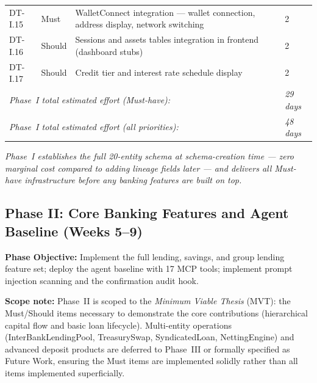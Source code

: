 \documentclass[12pt,a4paper]{report}
\begin{document}
\begin{table}[H]
\begin{tabular}{p{1.8cm}p{1.8cm}p{7.5cm}p{1.5cm}}
DT-I.15 & Must & WalletConnect integration --- wallet connection, address display, network switching & 2 \\
DT-I.16 & Should & Sessions and assets tables integration in frontend (dashboard stubs) & 2 \\
DT-I.17 & Should & Credit tier and interest rate schedule display & 2 \\
\hline
\multicolumn{3}{l}{\textit{Phase~I total estimated effort (Must-have):}} & \textit{29 days} \\
\multicolumn{3}{l}{\textit{Phase~I total estimated effort (all priorities):}} & \textit{48 days} \\
\hline
\end{tabular}
\end{table}


\vspace{2pt}
\noindent\textit{\small Phase~I establishes the full 20-entity schema at schema-creation time --- zero marginal cost compared to adding lineage fields later --- and delivers all Must-have infrastructure before any banking features are built on top.}

\subsection{Phase II: Core Banking Features and Agent Baseline (Weeks 5--9)}

\textbf{Phase Objective:} Implement the full lending, savings, and group lending
feature set; deploy the agent baseline with 17 MCP tools; implement prompt
injection scanning and the confirmation audit hook.

\textbf{Scope note:} Phase~II is scoped to the \textit{Minimum Viable Thesis} (MVT): the Must/Should items necessary to demonstrate the core contributions (hierarchical capital flow and basic loan lifecycle). Multi-entity operations (InterBankLendingPool, TreasurySwap, SyndicatedLoan, NettingEngine) and advanced deposit products are deferred to Phase~III or formally specified as Future Work, ensuring the Must items are implemented solidly rather than all items implemented superficially.
\end{document}
